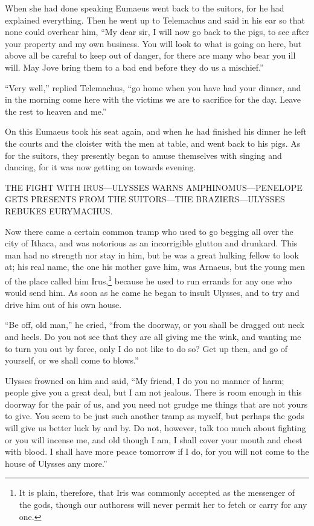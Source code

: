 When she had done speaking Eumaeus went back to the suitors, for he had
explained everything. Then he went up to Telemachus and said in his ear so that
none could overhear him, “My dear sir, I will now go back to the pigs, to see
after your property and my own business. You will look to what is going on
here, but above all be careful to keep out of danger, for there are many who
bear you ill will. May Jove bring them to a bad end before they do us a
mischief.”

“Very well,” replied Telemachus, “go home when you have had your dinner, and in
the morning come here with the victims we are to sacrifice for the day. Leave
the rest to heaven and me.”

On this Eumaeus took his seat again, and when he had finished his dinner he
left the courts and the cloister with the men at table, and went back to his
pigs. As for the suitors, they presently began to amuse themselves with singing
and dancing, for it was now getting on towards evening.


THE FIGHT WITH IRUS—ULYSSES WARNS AMPHINOMUS—PENELOPE GETS PRESENTS FROM THE
SUITORS—THE BRAZIERS—ULYSSES REBUKES EURYMACHUS.

Now there came a certain common tramp who used to go begging all over the city
of Ithaca, and was notorious as an incorrigible glutton and drunkard. This man
had no strength nor stay in him, but he was a great hulking fellow to look at;
his real name, the one his mother gave him, was Arnaeus, but the young men of
the place called him Irus,\footnote{It is plain, therefore, that Iris was commonly accepted as the messenger of
the gods, though our authoress will never permit her to fetch or carry for any
one.} because he used to run errands for
any one who would send him. As soon as he came he began to insult Ulysses, and
to try and drive him out of his own house.

“Be off, old man,” he cried, “from the doorway, or you shall be dragged out
neck and heels. Do you not see that they are all giving me the wink, and
wanting me to turn you out by force, only I do not like to do so? Get up then,
and go of yourself, or we shall come to blows.”

Ulysses frowned on him and said, “My friend, I do you no manner of harm; people
give you a great deal, but I am not jealous. There is room enough in this
doorway for the pair of us, and you need not grudge me things that are not
yours to give. You seem to be just such another tramp as myself, but perhaps
the gods will give us better luck by and by. Do not, however, talk too much
about fighting or you will incense me, and old though I am, I shall cover your
mouth and chest with blood. I shall have more peace tomorrow if I do, for you
will not come to the house of Ulysses any more.”

